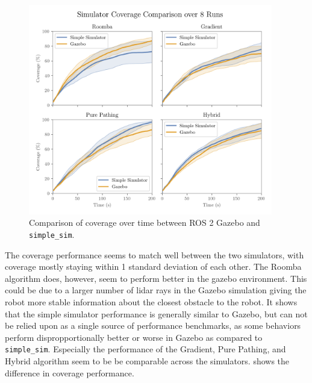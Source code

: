 \begin{figure}[H]
    \begin{center}
        \includegraphics[width=0.95\textwidth]{./figures/plots/consistency/gazebo_vs_simple_sim_coverage.png}
    \end{center}
  \caption{Comparison of coverage over time between ROS 2 Gazebo and \texttt{simple\_sim}.}
  \label{fig:coverage-benchmark-all}
\end{figure}

The coverage performance seems to match well between the two simulators, with coverage mostly staying within 1 standard deviation of each other. The Roomba algorithm does, however, seem to perform better in the gazebo environment. This could be due to a larger number of lidar rays in the Gazebo simulation giving the robot more stable information about the closest obstacle to the robot. It shows that the simple simulator performance is generally similar to Gazebo, but can not be relied upon as a single source of performance benchmarks, as some behaviors perform dispropportionally better or worse in Gazebo as compared to \texttt{simple\_sim}. Especially the performance of the Gradient, Pure Pathing, and Hybrid algorithm seem to be be comparable across the simulators.  shows the difference in coverage performance.

